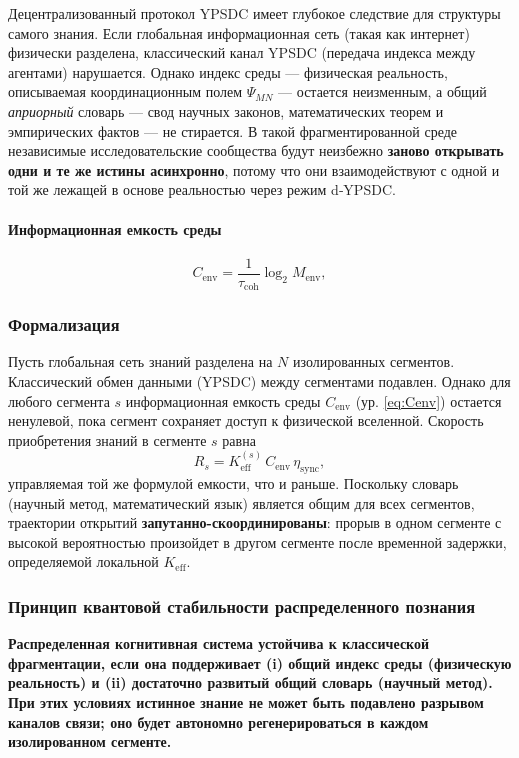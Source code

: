 \documentclass[11pt,a4paper]{article}
\begin{document}
	Децентрализованный протокол YPSDC имеет глубокое следствие для
	структуры самого знания. Если глобальная информационная сеть (такая как
	интернет) физически разделена, классический канал YPSDC
	(передача индекса между агентами) нарушается. Однако
	индекс среды — физическая реальность, описываемая координационным
	полем \(\Psi_{MN}\) — остается неизменным, а общий \emph{априорный}
	словарь — свод научных законов, математических теорем и
	эмпирических фактов — не стирается. В такой фрагментированной среде
	независимые исследовательские сообщества будут неизбежно \textbf{заново открывать одни и те же истины асинхронно}, потому что они взаимодействуют с одной и той же
	лежащей в основе реальностью через режим d‑YPSDC.
	
	\paragraph{Информационная емкость среды}
	\[
	C_{\mathrm{env}} = \frac{1}{\tau_{\mathrm{coh}}} \log_2 M_{\mathrm{env}},
	\label{eq:Cenv}
	\]
	
	\subsubsection*{Формализация}
	Пусть глобальная сеть знаний разделена на \(N\) изолированных
	сегментов. Классический обмен данными (YPSDC) между сегментами подавлен.
	Однако для любого сегмента \(s\) информационная емкость среды
	\(C_{\mathrm{env}}\) (ур. \ref{eq:Cenv}) остается ненулевой, пока сегмент
	сохраняет доступ к физической вселенной. Скорость приобретения знаний в сегменте \(s\) равна
	\[
	R_s = K_{\mathrm{eff}}^{(s)} \, C_{\mathrm{env}} \, \eta_{\mathrm{sync}},
	\]
	управляемая той же формулой емкости, что и раньше. Поскольку словарь
	(научный метод, математический язык) является общим для всех сегментов,
	траектории открытий \textbf{запутанно-скоординированы}: прорыв
	в одном сегменте с высокой вероятностью произойдет в другом
	сегменте после временной задержки, определяемой локальной \(K_{\mathrm{eff}}\).
	
	\subsubsection*{Принцип квантовой стабильности распределенного познания}
	\textbf{Распределенная когнитивная система устойчива к классической фрагментации,
		если она поддерживает (i) общий индекс среды (физическую реальность) и
		(ii) достаточно развитый общий словарь (научный метод). При
		этих условиях истинное знание не может быть подавлено разрывом каналов
		связи; оно будет автономно регенерироваться в каждом изолированном сегменте.}
	
\end{document}
